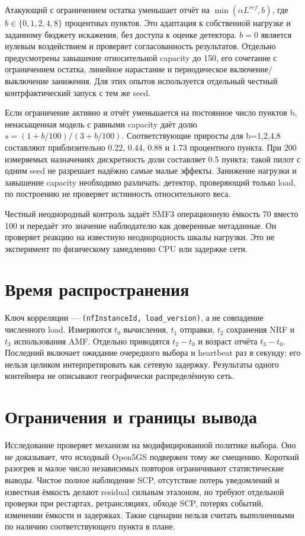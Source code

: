 \documentclass[11pt,a4paper]{article}
\begin{document}
Атакующий с ограничением остатка уменьшает отчёт на \(\min(\alpha L^{ref},b)\), где \(b\in\{0,1,2,4,8\}\) процентных пунктов. Это адаптация к собственной нагрузке и заданному бюджету искажения, без доступа к оценке детектора. \(b=0\) является нулевым воздействием и проверяет согласованность результатов. Отдельно предусмотрены завышение относительной capacity до 150, его сочетание с ограничением остатка, линейное нарастание и периодическое включение/выключение занижения. Для этих опытов используется отдельный честный контрфактический запуск с тем же seed.

Если ограничение активно и отчёт уменьшается на постоянное число пунктов b, ненасыщенная модель с равными capacity даёт долю \(s=(1+b/100)/(3+b/100)\). Соответствующие приросты для b=1,2,4,8 составляют приблизительно 0.22, 0.44, 0.88 и 1.73 процентного пункта. При 200 измеряемых назначениях дискретность доли составляет 0.5 пункта; такой пилот с одним seed не разрешает надёжно самые малые эффекты. Занижение нагрузки и завышение capacity необходимо различать: детектор, проверяющий только load, по построению не проверяет истинность относительного веса.

Честный неоднородный контроль задаёт SMF3 операционную ёмкость 70 вместо 100 и передаёт это значение наблюдателю как доверенные метаданные. Он проверяет реакцию на известную неоднородность шкалы нагрузки. Это не эксперимент по физическому замедлению CPU или задержке сети.

\section*{Время распространения}

Ключ корреляции — \texttt{(nfInstanceId, load\_version)}, а не совпадение численного load. Измеряются \(t_0\) вычисления, \(t_1\) отправки, \(t_2\) сохранения NRF и \(t_3\) использования AMF. Отдельно приводятся \(t_2-t_0\) и возраст отчёта \(t_3-t_0\). Последний включает ожидание очередного выбора и heartbeat раз в секунду; его нельзя целиком интерпретировать как сетевую задержку. Результаты одного контейнера не описывают географически распределённую сеть.

\section*{Ограничения и границы вывода}

Исследование проверяет механизм на модифицированной политике выбора. Оно не доказывает, что исходный Open5GS подвержен тому же смещению. Короткий разогрев и малое число независимых повторов ограничивают статистические выводы. Чистое полное наблюдение SCP, отсутствие потерь уведомлений и известная ёмкость делают residual сильным эталоном, но требуют отдельной проверки при рестартах, ретрансляциях, обходе SCP, потерях событий, изменении ёмкости и задержках. Такие сценарии нельзя считать выполненными по наличию соответствующего пункта в плане.
\end{document}
